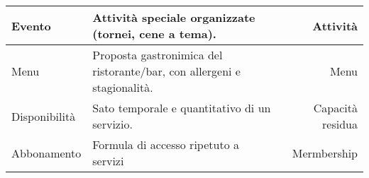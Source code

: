 \documentclass[a4paper,11pt]{report}
\begin{document}
\begin{center}
\begin{tabularx}{\textwidth}{ l X r }
        \hline
        Evento               & Attività speciale organizzate (tornei, cene a tema).                                                & Attività          \\
        \hline
        Menu                 & Proposta gastronimica del ristorante/bar, con allergeni e stagionalità.                             & Menu              \\
        \hline
        Disponibilità        & Sato temporale e quantitativo di un servizio.                                                       & Capacità residua  \\
        \hline
        Abbonamento          & Formula di accesso ripetuto a servizi                                                               & Mermbership       \\
    \end{tabularx}
\end{center}
\end{document}

